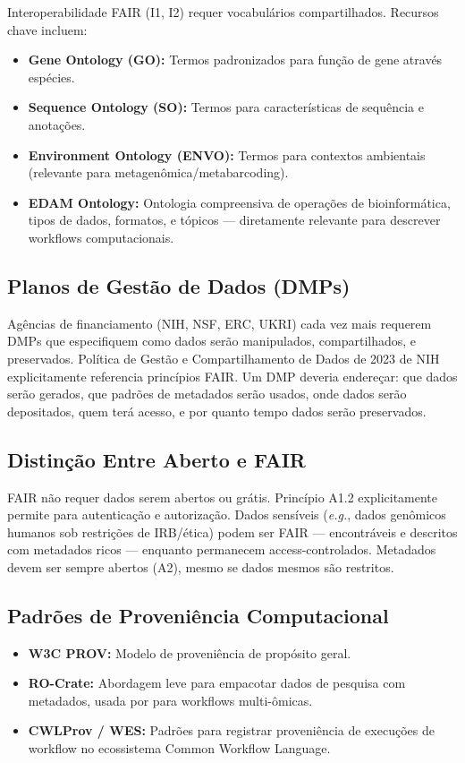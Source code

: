 Interoperabilidade FAIR (I1, I2) requer vocabulários compartilhados. Recursos chave incluem:

\begin{itemize}
\item \textbf{Gene Ontology (GO):} Termos padronizados para função de gene através espécies.
\item \textbf{Sequence Ontology (SO):} Termos para características de sequência e anotações.
\item \textbf{Environment Ontology (ENVO):} Termos para contextos ambientais (relevante para metagenômica/metabarcoding).
\item \textbf{EDAM Ontology:} Ontologia compreensiva de operações de bioinformática, tipos de dados, formatos, e tópicos --- diretamente relevante para descrever workflows computacionais.
\end{itemize}

\subsection{Planos de Gestão de Dados (DMPs)}

Agências de financiamento (NIH, NSF, ERC, UKRI) cada vez mais requerem DMPs que especifiquem como dados serão manipulados, compartilhados, e preservados. Política de Gestão e Compartilhamento de Dados de 2023 de NIH explicitamente referencia princípios FAIR. Um DMP deveria endereçar: que dados serão gerados, que padrões de metadados serão usados, onde dados serão depositados, quem terá acesso, e por quanto tempo dados serão preservados.

\subsection{Distinção Entre Aberto e FAIR}

FAIR não requer dados serem abertos ou grátis. Princípio A1.2 explicitamente permite para autenticação e autorização. Dados sensíveis (\textit{e.g.}, dados genômicos humanos sob restrições de IRB/ética) podem ser FAIR --- encontráveis e descritos com metadados ricos --- enquanto permanecem access-controlados. Metadados devem ser sempre abertos (A2), mesmo se dados mesmos são restritos.

\subsection{Padrões de Proveniência Computacional}

\begin{itemize}
\item \textbf{W3C PROV:} Modelo de proveniência de propósito geral.
\item \textbf{RO-Crate:} Abordagem leve para empacotar dados de pesquisa com metadados, usada por \textcite{niehues2024} para workflows multi-ômicas.
\item \textbf{CWLProv / WES:} Padrões para registrar proveniência de execuções de workflow no ecossistema Common Workflow Language.
\end{itemize}

